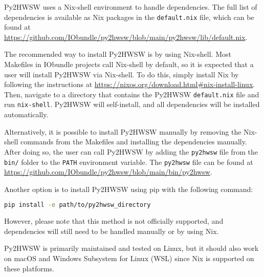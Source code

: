 %

Py2HWSW uses a Nix-shell environment to handle dependencies. The full list of dependencies is available as Nix packages in the \texttt{default.nix} file, which can be found at \url{https://github.com/IObundle/py2hwsw/blob/main/py2hwsw/lib/default.nix}.

The recommended way to install Py2HWSW is by using Nix-shell. Most Makefiles in IObundle projects call Nix-shell by default, so it is expected that a user will install Py2HWSW via Nix-shell. To do this, simply install Nix by following the instructions at \url{https://nixos.org/download.html#nix-install-linux}. Then, navigate to a directory that contains the Py2HWSW \texttt{default.nix} file and run \texttt{nix-shell}. Py2HWSW will self-install, and all dependencies will be installed automatically.

Alternatively, it is possible to install Py2HWSW manually by removing the Nix-shell commands from the Makefiles and installing the dependencies manually. After doing so, the user can call Py2HWSW by adding the \texttt{py2hwsw} file from the \texttt{bin/} folder to the \texttt{PATH} environment variable. The \texttt{py2hwsw} file can be found at \url{https://github.com/IObundle/py2hwsw/blob/main/bin/py2hwsw}.

Another option is to install Py2HWSW using pip with the following command:
\begin{lstlisting}[language=bash]
pip install -e path/to/py2hwsw_directory
\end{lstlisting}
However, please note that this method is not officially supported, and dependencies will still need to be handled manually or by using Nix.

Py2HWSW is primarily maintained and tested on Linux, but it should also work on macOS and Windows Subsystem for Linux (WSL) since Nix is supported on these platforms.
